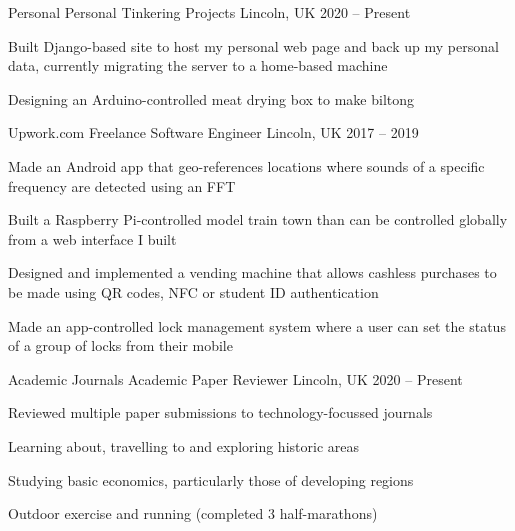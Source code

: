 \documentclass[11pt,a4paper]{awesome-cv}        %
\begin{document}

\begin{cventries}

  \cventry
  {Personal}
  {Personal Tinkering Projects}
  {Lincoln, UK}
  {2020 -- Present}
  {
    \begin{cvitems}
      \item Built Django-based site to host my personal web page and back up my personal data, currently migrating the server to a home-based machine
      \item Designing an Arduino-controlled meat drying box to make biltong
    \end{cvitems}
  }
  \cventry
  {Upwork.com}
  {Freelance Software Engineer}
  {Lincoln, UK}
  {2017 -- 2019}
  {
    \begin{cvitems}
      \item Made an Android app that geo-references locations where sounds of a specific frequency are detected using an FFT
      \item Built a Raspberry Pi-controlled model train town than can be controlled globally from a web interface I built
      \item Designed and implemented a vending machine that allows cashless purchases to be made using QR codes, NFC or student ID authentication 
      \item Made an app-controlled lock management system where a user can set the status of a group of locks from their mobile
    \end{cvitems}
  }
  \cventry
  {Academic Journals}
  {Academic Paper Reviewer}
  {Lincoln, UK}
  {2020 -- Present}
  {
    \begin{cvitems}
    \item Reviewed multiple paper submissions to technology-focussed journals
    \end{cvitems}
  }
\end{cventries}


\begin{cventries}

  \cventry
  {
  }
  {}
  {}
  {}
  {
    \begin{cvitems}
      \item Learning about, travelling to and exploring historic areas
      \item Studying basic economics, particularly those of developing regions
      \item Outdoor exercise and running (completed 3 half-marathons)
    \end{cvitems}
  }
\end{cventries}
\end{document}
